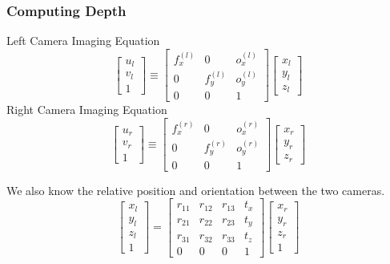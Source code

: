 \begin{frame}
    \frametitle{Computing Depth}
    Left Camera Imaging Equation
    $$
    \begin{bmatrix} u_l \\ v_l \\ 1 \end{bmatrix} \equiv
    \begin{bmatrix}
        f_x^{(l)} & 0 & o_x^{(l)} \\
        0 & f_y^{(l)} & o_y^{(l)} \\
        0 & 0 & 1
    \end{bmatrix}
    \begin{bmatrix} x_l \\ y_l \\ z_l \end{bmatrix}
    $$
    Right Camera Imaging Equation
    $$
    \begin{bmatrix} u_r \\ v_r \\ 1 \end{bmatrix} \equiv
    \begin{bmatrix}
        f_x^{(r)} & 0 & o_x^{(r)} \\
        0 & f_y^{(r)} & o_y^{(r)} \\
        0 & 0 & 1
    \end{bmatrix}
    \begin{bmatrix} x_r \\ y_r \\ z_r \end{bmatrix}
    $$

    We also know the relative position and orientation between the two cameras.
    $$
    \begin{bmatrix} x_l \\ y_l \\ z_l \\ 1 \end{bmatrix} =
    \begin{bmatrix}
        r_{11} & r_{12} & r_{13} & t_x \\
        r_{21} & r_{22} & r_{23} & t_y \\
        r_{31} & r_{32} & r_{33} & t_z \\
        0 & 0 & 0 & 1
    \end{bmatrix}
    \begin{bmatrix} x_r \\ y_r \\ z_r \\ 1 \end{bmatrix}
    $$
\end{frame}

